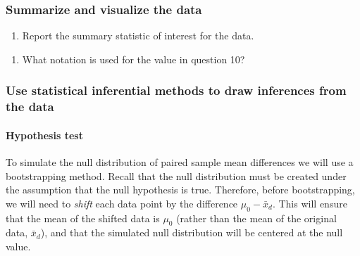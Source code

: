 \documentclass[
]{report}
\providecommand{\tightlist}{%
  \setlength{\itemsep}{0pt}\setlength{\parskip}{0pt}}
\begin{document}
\vspace{0.8in}

\hypertarget{summarize-and-visualize-the-data-2}{%
\subsubsection*{Summarize and visualize the data}\label{summarize-and-visualize-the-data-2}}

\begin{enumerate}
\def\labelenumi{\arabic{enumi}.}
\setcounter{enumi}{9}
\tightlist
\item
  Report the summary statistic of interest for the data.
\end{enumerate}

\vspace{0.3in}

\begin{enumerate}
\def\labelenumi{\arabic{enumi}.}
\setcounter{enumi}{10}
\tightlist
\item
  What notation is used for the value in question 10?
\end{enumerate}

\vspace{0.3in}

\hypertarget{use-statistical-inferential-methods-to-draw-inferences-from-the-data}{%
\subsubsection*{Use statistical inferential methods to draw inferences from the data}\label{use-statistical-inferential-methods-to-draw-inferences-from-the-data}}

\hypertarget{hypothesis-test}{%
\paragraph*{Hypothesis test}\label{hypothesis-test}}

To simulate the null distribution of paired sample mean differences we will use a bootstrapping method. Recall that the null distribution must be created under the assumption that the null hypothesis is true. Therefore, before bootstrapping, we will need to \emph{shift} each data point by the difference \(\mu_0 - \bar{x}_d\). This will ensure that the mean of the shifted data is \(\mu_0\) (rather than the mean of the original data, \(\bar{x}_d\)), and that the simulated null distribution will be centered at the null value.
\end{document}

